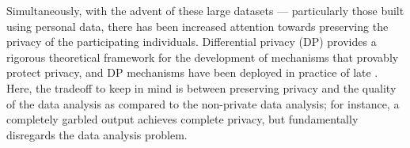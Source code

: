 \documentclass[11pt]{article}
\theoremstyle{definition}
\theoremstyle{plain}
\begin{document}

Simultaneously, with the advent of these large datasets --- particularly those built using personal data, there has been increased attention towards preserving the privacy of the participating individuals.
Differential privacy (DP) \citep{dwork2006calibrating} provides a rigorous theoretical framework for the development of mechanisms that provably protect privacy, and DP mechanisms have been deployed in practice of late \citep{apple2017learning,  census, facebook2020protecting, snap2022differential}. Here, the tradeoff to keep in mind is between preserving privacy and the quality of the data analysis as compared to the non-private data analysis; for instance, a completely garbled output achieves complete privacy, but fundamentally disregards the data analysis problem.
\end{document}

